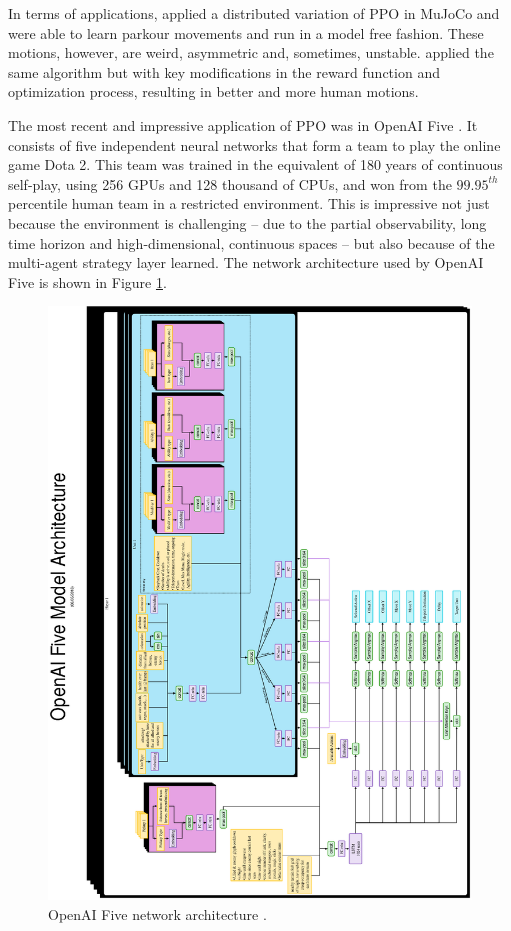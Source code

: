In terms of applications, \citeauthor{DBLP:journals/corr/HeessTSLMWTEWER17} applied a distributed variation of PPO in MuJoCo and were able to learn parkour movements and run in a model free fashion. These motions, however, are weird, asymmetric and, sometimes, unstable. \citeauthor{peng2018} applied the same algorithm but with key modifications in the reward function and optimization process, resulting in better and more human motions.

The most recent and impressive application of PPO was in OpenAI Five \cite{openaifive}. It consists of five independent neural networks that form a team to play the online game Dota 2. This team was trained in the equivalent of 180 years of continuous self-play, using 256 GPUs and 128 thousand of CPUs, and won from the $99.95^{th}$ percentile human team in a restricted environment. This is impressive not just because the environment is challenging -- due to the partial observability, long time horizon and high-dimensional, continuous spaces -- but also because of the multi-agent strategy layer learned. The network architecture used by OpenAI Five is shown in Figure \ref{openaifive}.

\begin{figure}[ht!]
	\centering
	\includegraphics[scale=0.8]{Cap2/openaifive.eps}
	\caption{OpenAI Five network architecture \cite{openaifive}.}
	\label{openaifive}
\end{figure}

